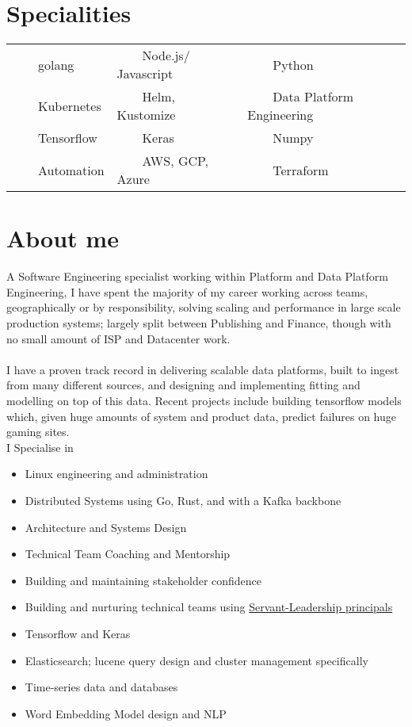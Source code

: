 \documentclass[11pt,a4paper,sans]{article}
\newcommand{\tabitem}{~~\llap{\textbullet}~~}
\begin{document}
\newcommand{\job}{Engineering Lead/ Principal Engineer}


\section{Specialities}
\begin{tabular}{lll}
  \tabitem golang & \tabitem Node.js/ Javascript & \tabitem Python \\
  \tabitem Kubernetes & \tabitem Helm, Kustomize & \tabitem Data Platform Engineering \\
  \tabitem Tensorflow & \tabitem Keras & \tabitem Numpy \\
  \tabitem Automation & \tabitem AWS, GCP, Azure & \tabitem Terraform  \\
\end{tabular}

\section{About me}
A Software Engineering specialist working within Platform and Data Platform Engineering, I have spent the majority of my career working across teams, geographically or by responsibility, solving scaling and performance in large scale production systems; largely split between Publishing and Finance, though with no small amount of ISP and Datacenter work. \\
\\
I have a proven track record in delivering scalable data platforms, built to ingest from many different sources, and designing and implementing fitting and modelling on top of this data. Recent projects include building tensorflow models which, given huge amounts of system and product data, predict failures on huge gaming sites.
\\
I Specialise in

\begin{itemize}
\item Linux engineering and administration
\item Distributed Systems using Go, Rust, and with a Kafka backbone
\item Architecture and Systems Design
\item Technical Team Coaching and Mentorship
\item Building and maintaining stakeholder confidence
\item Building and nurturing technical teams using \href{https://www.mindtools.com/pages/article/servant-leadership.htm}{Servant-Leadership principals}
\item Tensorflow and Keras
\item Elasticsearch; lucene query design and cluster management specifically
\item Time-series data and databases
\item Word Embedding Model design and NLP
\end{itemize}






\end{document}
